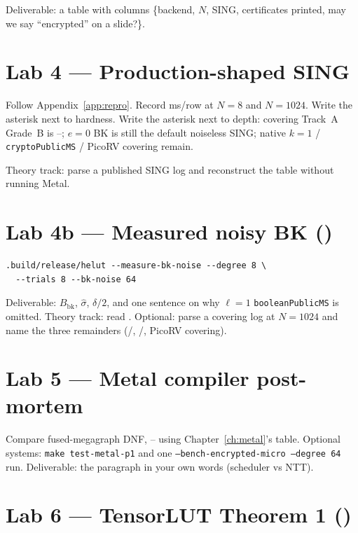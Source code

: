 Deliverable: a table with columns \{backend, $N$, SING, certificates
printed, may we say ``encrypted'' on a slide?\}.

\section{Lab 4 --- Production-shaped SING}


Follow Appendix~\ref{app:repro}. Record ms/row at $N=8$ and $N=1024$.
Write the  asterisk next to hardness.
Write the  asterisk next to depth: covering Track~A Grade~B is
--; $e{=}0$ BK is still the default noiseless SING;
native $k{=}1$ / \texttt{cryptoPublicMS} / PicoRV covering remain.

Theory track: parse a published SING log and reconstruct the table
without running Metal.

\section{Lab 4b --- Measured noisy BK ()}

\begin{lstlisting}
.build/release/helut --measure-bk-noise --degree 8 \
  --trials 8 --bk-noise 64
\end{lstlisting}

Deliverable: $B_{\mathrm{bk}}$, $\hat\sigma$, $\delta/2$, and one sentence
on why $\ell=1$ \texttt{booleanPublicMS} is omitted.
Theory track: read .
Optional: parse a  covering log at $N{=}1024$ and name the three
\hid{4} remainders (\cid{37}/\cid{55}, \cid{26}/\cid{56}, PicoRV covering).

\section{Lab 5 --- Metal compiler post-mortem}

Compare fused-megagraph DNF, -- using
Chapter~\ref{ch:metal}'s table.
Optional systems: \texttt{make test-metal-p1} and one
\texttt{--bench-encrypted-micro --degree 64} run.
Deliverable: the  paragraph in your own words (scheduler vs NTT).

\section{Lab 6 --- TensorLUT Theorem 1 ()}

